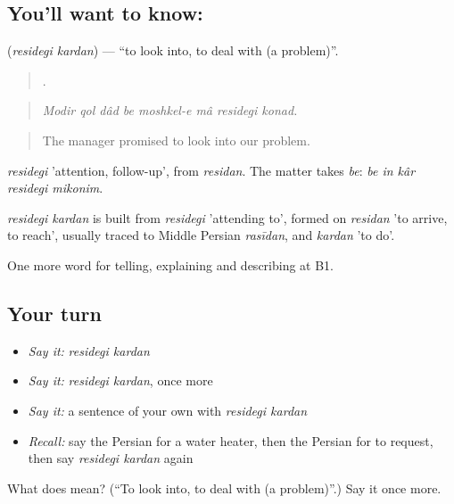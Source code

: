 \subsection*{You'll want to know:  }
\textbf{ } (\emph{residegi kardan}) — \textquotedblleft{}to look into, to deal with (a problem)\textquotedblright{}.

\begin{quote}
       .
\end{quote}

\begin{quote}
\emph{Modir qol dâd be moshkel-e mâ residegi konad.}
\end{quote}

\begin{quote}
The manager promised to look into our problem.
\end{quote}

\emph{residegi} 'attention, follow-up', from \emph{residan}. The matter takes \emph{be}: \emph{be in kâr residegi mikonim}.

\begin{cousinweb}
\emph{residegi kardan} is built from \emph{residegi} 'attending to', formed on \emph{residan} 'to arrive, to reach', usually traced to Middle Persian \emph{rasīdan}, and \emph{kardan} 'to do'.
\end{cousinweb}

\begin{grammarlens}[title={What you've built}]
One more word for telling, explaining and describing at B1.
\end{grammarlens}

\subsection*{Your turn}
\begin{itemize}
\raggedright
  \item \emph{Say it:} \emph{residegi kardan}
  \item \emph{Say it:} \emph{residegi kardan}, once more
  \item \emph{Say it:} a sentence of your own with \emph{residegi kardan}
  \item \emph{Recall:} say the Persian for a water heater, then the Persian for to request, then say \emph{residegi kardan} again
\end{itemize}

\begin{tcolorbox}[breakable,colback=teal!4,colframe=teal!35!black,title={Before you move on}]
What does   mean? (\textquotedblleft{}To look into, to deal with (a problem)\textquotedblright{}.) Say it once more.
\end{tcolorbox}
